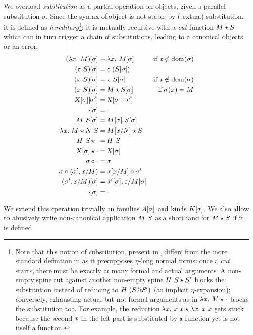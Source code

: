 \documentclass{llncs}
\begin{document}
We overload \emph{substitution} as a partial operation on objects,
given a parallel substitution $\sigma$. Since the syntax of object is
not stable by (textual) substitution, it is defined as
\emph{hereditary}\footnote{ Note that this notion of substitution,
  present in \cite{pfenning2007term}, differs from the more standard
  definition in \cite{hl07mechanizing} as it presupposes $\eta$-long
  normal forms: once a \emph{cut} starts, there must be exactly as
  many formal and actual arguments. A non-empty spine cut against
  another non-empty spine ${{H}\  S}\star{S'}$ blocks the
  substitution instead of reducing to ${H}\  {({S}@{S}')}$ (an
  implicit $\eta$-expansion); conversely, exhausting actual but not
  formal arguments as in ${\lambda{\ensuremath{\text{\textit{x}}}}.\  M}\star{\cdot}$ blocks the
  substitution too. For example, the reduction ${\lambda{\ensuremath{\text{\textit{x}}}}.\  {\text{\textit{x}}}\ {\text{\textit{x}}}}\star{\lambda{\ensuremath{\text{\textit{x}}}}.\ {\ensuremath{\text{\textit{x}}}}\ {\ensuremath{\text{\textit{x}}}}}$ gets stuck
  because the second $\text{\textit{x}}$ in the left part is substituted by a
  function yet is not itself a function. }: it is mutually recursive
with a \emph{cut} function ${M}\star{S}$ which can in turn trigger a
chain of substitutions, leading to a canonical objects or an error.
\begin{align*}
  {(\lambda{\ensuremath{\text{\textit{x}}}}.\ M)}[{\sigma}] &= \lambda{\ensuremath{\text{\textit{x}}}}.\  {{M}[{\sigma}]} &
  \text{if $\text{\textit{x}}\notin \operatorname{dom}{\!(\sigma)}$}
  \\
  {({\text{\textsf{c}}}\  S)}[{\sigma}] &= {\text{\textsf{c}}}\  {({S}[{\sigma}])}
  \\
  {({\text{\textit{x}}}\  S)}[{\sigma}] &=
  {\text{\textit{x}}}\  {{S}[{\sigma}]} &
  \text{if $\text{\textit{x}}\notin \operatorname{dom}{\!(\sigma)}$}
  \\
  {({\text{\textit{x}}}\  S)}[{\sigma}] &=
  {M}\star{{S}[{\sigma}]} &
  \text{if $\sigma(\text{\textit{x}}) = M$}
  \\
  {{\text{\textsl{X}}}[{\sigma}]}[{\sigma'}] &=
  {\text{\textsl{X}}}[{{\sigma}\circ{\sigma'}}]
  \\
  {\cdot}[{\sigma}] &=
  \cdot \\
  {{M}\ {S}}[{\sigma}] &=
  {{M}[{\sigma}]}\ {{S}[{\sigma}]}
  \\
  {\lambda{\ensuremath{\text{\textit{x}}}}.\  M}\star{{N}\ {S}} &=
  {{M}[{{\text{\textit{x}}}/{N}}]}\star{S}
  \\
  {{H}\  S}\star{\cdot} &=
  {H}\  S
  \\
  {{\text{\textsl{X}}}[{\sigma}]}\star{\cdot} &= {\text{\textsl{X}}}[{\sigma}]
  \\
  {\sigma}\circ{\cdot} &=
  \sigma
  \\
  {\sigma}\circ{({\sigma'},{{\ensuremath{\text{\textit{x}}}}/{M}})} &=
  {{\sigma}[{{\text{\textit{x}}}/{M}}]}\circ{\sigma}'
  \\
  {({\sigma'},{{\text{\textit{x}}}/{M}})}[{\sigma}] &=
  {{\sigma'}[{\sigma}]},{{\text{\textit{x}}}/{{M}[{\sigma}]}}
  \\
  {\cdot}[{\sigma}] &= \cdot
\end{align*}

We extend this operation trivially on families ${A}[{\sigma}]$ and
kinds ${K}[{\sigma}]$. We also allow to abusively write
non-canonical application ${M}\  S$ as a shorthand for ${M}\star{S}$
if it is defined.

\end{document}

